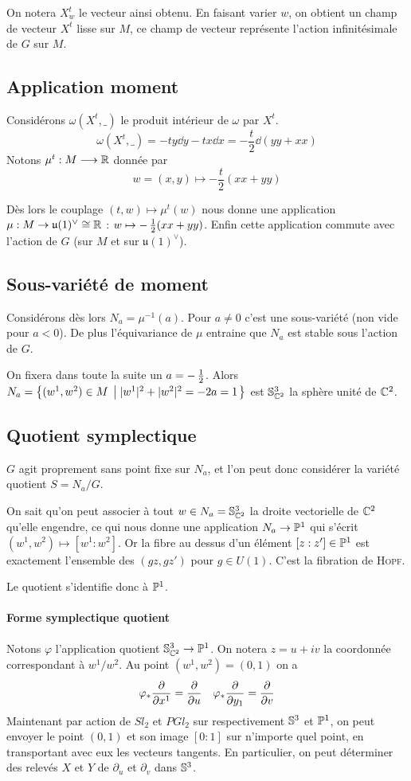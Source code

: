 \documentclass[a4paper,draft]{amsart}
\begin{document}
On notera $X_w^t$ le vecteur ainsi obtenu. En faisant varier $w$, on obtient un champ de vecteur $X^t$ lisse sur $M$, ce champ de vecteur représente l'action infinitésimale de $G$ sur $M$.

\subsection{Application moment}
Considérons $\omega(X^t,\_)$ le produit intérieur de $\omega$ par $X^t$.
\[
\omega(X^t,\_) = -ty\dd y -tx \dd x = -\dfrac{t}{2}\dd (yy + xx) 
\]
Notons $\mu^t : M \longrightarrow \R$ donnée par \[
w=(x,y) \mapsto -\dfrac{t}{2}( xx + yy )\]

Dès lors le couplage $(t,w) \mapsto \mu^t(w)$ nous donne une application $\mu : M \rightarrow \mathfrak{u}(1)^\vee \cong \R$ : 
$w \mapsto -\demi( xx + yy )$.
Enfin cette application commute avec l'action de $G$ (sur $M$ et sur $\mathfrak{u}(1)^\vee$).

\subsection{Sous-variété de moment}
Considérons dès lors $N_a = \mu^{-1}(a)$. Pour $a \neq 0$ c'est une sous-variété (non vide pour $a<0$). De plus l'équivariance de $\mu$ entraine que $N_a$ est stable sous l'action de $G$.

On fixera dans toute la suite un $a=-\demi$. Alors $N_a = \ens{(w^1,w^2)\in M}{|w^1|^2 + |w^2|^2 = -2a=1}$ est $\S^3_{\C^2}$ la sphère unité de $\C^2$.

\subsection{Quotient symplectique}
$G$ agit proprement sans point fixe sur $N_a$, et l'on peut donc considérer la variété quotient $S = N_a/G$.

On sait qu'on peut associer à tout $w \in N_a = \S^3_{\C^2}$ la droite vectorielle de $\C^2$ qu'elle engendre, ce qui nous donne une application $N_a \rightarrow \Pro^1$ qui s'écrit $(w^1,w^2) \mapsto [w^1 : w^2]$. Or la fibre au dessus d'un élément $[z:z'] \in \Pro^1$ est exactement l'ensemble des $(gz,gz')$ pour $g \in U(1)$. C'est la fibration de \textsc{Hopf}.

Le quotient s'identifie donc à $\Pro^1$.

\paragraph{Forme symplectique quotient} Notons $\varphi$ l'application quotient $ \S^3_{\C^2} \rightarrow \Pro^1$. On notera $z=u+iv$ la coordonnée correspondant à $w^1/w^2$. Au point $(w^1,w^2) = (0,1)$ on a
\[
\varphi_* \dpp{}{x^1} = \dpp{}{u} \quad 
\varphi_* \dpp{}{y_1} = \dpp{}{v}
\]
Maintenant par action de $Sl_2$ et $PGl_2$ sur respectivement $\S^3$ et $\Pro^1$, on peut envoyer le point $(0,1)$ et son image $[0:1]$ sur n'importe quel point, en transportant avec eux les vecteurs tangents. En particulier, on peut déterminer des relevés $X$ et $Y$ de $\partial_u$ et $\partial_v$ dans $\S^3$.
\end{document}

